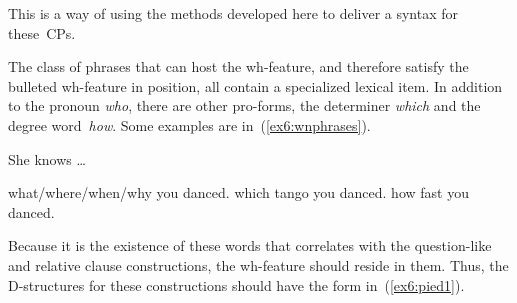 This is a way of using the methods developed here to deliver a syntax for these~CPs.

The class of phrases that can host the wh-feature, and therefore satisfy the bulleted wh-feature in  position, all contain a specialized lexical item. In addition to the pronoun \emph{who}, there are other pro-forms, the determiner \emph{which} and the degree word~\emph{how}. Some examples are in~(\ref{ex6:wnphrases}).
\begin{exe}
\raggedright
	\ex \label{ex6:wnphrases} She knows \ldots
	\begin{xlist}
		\ex what/where/when/why you danced.
		\ex which tango you danced.
		\ex how fast you danced.
	\end{xlist}
\end{exe}
Because it is the existence of these words that correlates with the question-like and relative clause constructions, the wh-feature should reside in them. Thus, the D-structures for these constructions should have the form in~(\ref{ex6:pied1}).
\medskip
